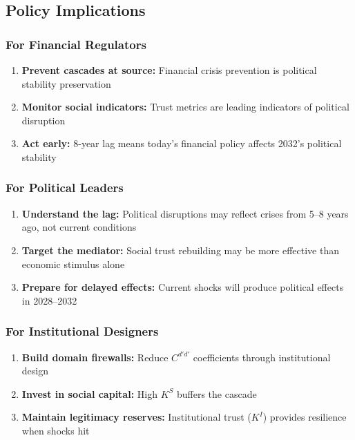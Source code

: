 \subsection{Policy Implications}

\subsubsection{For Financial Regulators}

\begin{enumerate}
    \item \textbf{Prevent cascades at source:} Financial crisis prevention is 
    political stability preservation
    \item \textbf{Monitor social indicators:} Trust metrics are leading indicators 
    of political disruption
    \item \textbf{Act early:} 8-year lag means today's financial policy affects 
    2032's political stability
\end{enumerate}

\subsubsection{For Political Leaders}

\begin{enumerate}
    \item \textbf{Understand the lag:} Political disruptions may reflect crises 
    from 5--8 years ago, not current conditions
    \item \textbf{Target the mediator:} Social trust rebuilding may be more 
    effective than economic stimulus alone
    \item \textbf{Prepare for delayed effects:} Current shocks will produce 
    political effects in 2028--2032
\end{enumerate}

\subsubsection{For Institutional Designers}

\begin{enumerate}
    \item \textbf{Build domain firewalls:} Reduce $C^{d'd'}$ coefficients through 
    institutional design
    \item \textbf{Invest in social capital:} High $K^S$ buffers the cascade
    \item \textbf{Maintain legitimacy reserves:} Institutional trust ($K^I$) 
    provides resilience when shocks hit
\end{enumerate}

